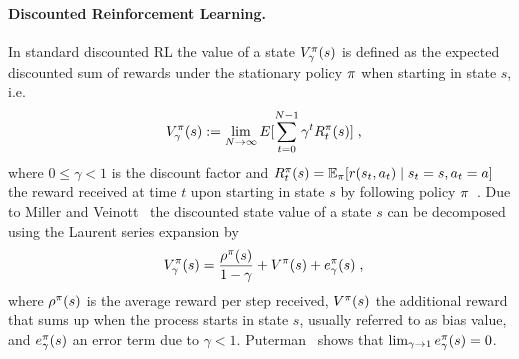 \documentclass[envcountsame]{llncs}
\begin{document}
\paragraph{Discounted Reinforcement Learning.}
In standard discounted RL the value of a state \(V_{\gamma}^{\pi}(s)\) is defined as the expected
discounted sum of rewards under the stationary policy \(\pi\) when starting in state \(s\), i.e.
\begin{align*}
  V_{\gamma}^{\pol}(s) \defsym \lim_{N \to \infty} E[\sum_{t=0}^{N-1} \gamma^{t} R_{t}^{\pol}(s)]\tcom
\end{align*}
where \(0 \leqslant \gamma < 1\) is the discount factor and
\(R_{t}^{\pi}(s) = \operatorname*{\mathbb{E}}_{\pi}[ r(s_{t},a_{t}) \mid s_{t} = s, a_{t} = a]\) the reward received at
time \(t\) upon starting in state \(s\) by following policy
\(\pi\)~\cite[e.g.]{Mahadevan96_AverageRewardReinforcementLearningFoundationsAlgorithmsAndEmpiricalResults}.
%
Due to Miller and Veinott~\cite{MillerVeinott1969} the discounted state value of a state \(s\) can
be decomposed using the Laurent series expansion by
%
\begin{align}
  \label{eq:laurent}
  V_{\gamma}^{\pol}(s) = \frac{\avgrew^{\pol}(s)}{1-\gamma} + V^{\pol}(s) + e_{\gamma}^{\pol}(s) \tcom
\end{align}
%
where \(\rho^{\pi}(s)\) is the average reward per step received, \(V^{\pi}(s)\) the additional
reward that sums up when the process starts in state \(s\), usually referred to as bias value, and
\(e_{\gamma}^{\pi}(s)\) an error term due to \(\gamma < 1\). Puterman~\cite[p.341]{Puterman94}
shows that \(\lim_{\gamma \to 1} e_{\gamma}^{\pi}(s) = 0\).
\end{document}
